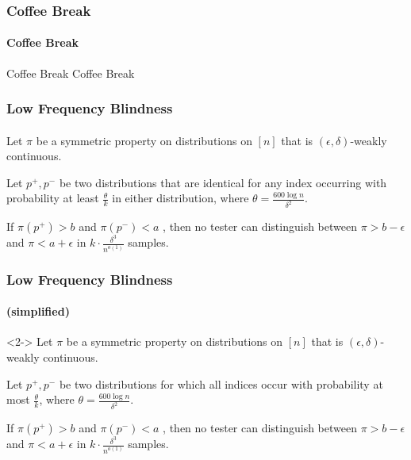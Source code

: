 \documentclass{beamer}
\begin{document}
\begin{frame}
  \frametitle{Coffee Break}
  \framesubtitle{Coffee Break}
  \begin{block}{Coffee Break}
    Coffee Break
  \end{block}
\end{frame}

\begin{frame}
  \frametitle{Low Frequency Blindness} \framesubtitle{}
  \begin{theorem}
    Let $\pi$ be a symmetric property on distributions on $[n]$ that
    is $(\epsilon,\delta)$-weakly continuous.

    Let $p^+,p^-$ be two distributions that are identical for any
    index occurring with probability at least $\frac{\theta}{k}$ in
    either distribution, where $\theta=\frac{600\log n}{\delta^2}$.

    If $\pi(p^+)>b$ and $\pi(p^-)<a$ , then no tester can distinguish
    between $\pi>b-\epsilon$ and $\pi<a+\epsilon$ in $k\cdot
    \frac{\delta^3}{n^{o(1)}}$ samples.
  \end{theorem}
\end{frame}



\begin{frame}
  \frametitle{Low Frequency Blindness} \framesubtitle{(simplified)}
  \begin{lemma}<2->
    Let $\pi$ be a symmetric property on distributions on $[n]$ that
    is $(\epsilon,\delta)$-weakly continuous.

    Let $p^+,p^-$ be two distributions for which all indices occur
    with probability at most $\frac{\theta}{k}$, where
    $\theta=\frac{600\log n}{\delta^2}$.

    If $\pi(p^+)>b$ and $\pi(p^-)<a$ , then no tester can distinguish
    between $\pi>b-\epsilon$ and $\pi<a+\epsilon$ in $k\cdot
    \frac{\delta^3}{n^{o(1)}}$ samples.
  \end{lemma}
\end{frame}
\end{document}
